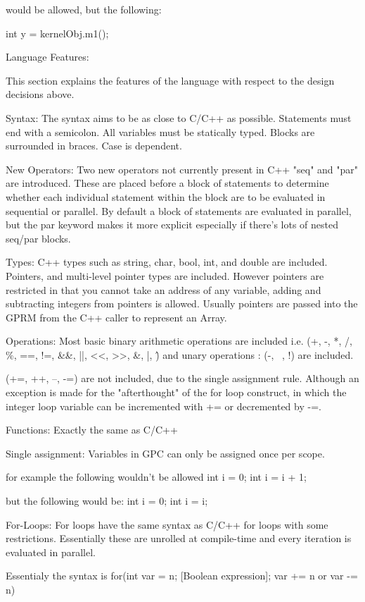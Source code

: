         would be allowed, but the following:

        int y = kernelObj.m1();



Language Features:

    This section explains the features of the language with respect to the design decisions above.

    Syntax:
        The syntax aims to be as close to C/C++ as possible. Statements must end with a semicolon. 
        All variables must be statically typed. Blocks are surrounded in braces. Case is dependent.

    New Operators:
        Two new operators not currently present in C++ "seq" and "par" are introduced. 
        These are placed before a block
        of statements to determine whether each individual statement within the block are
        to be evaluated in sequential or parallel. By default a block of statements are evaluated
        in parallel, but the par keyword makes it more explicit especially if there's lots of nested
        seq/par blocks.

    Types:
        C++ types such as string, char, bool, int, and double are included.
        Pointers, and multi-level pointer types are included.
        However pointers are restricted in that you cannot take
        an address of any variable, adding and subtracting integers
        from pointers is allowed. Usually pointers are passed into
        the GPRM from the C++ caller to represent an Array.
        
    Operations:
        Most basic binary arithmetic operations are included i.e. 
        (+, -, *, /, \%, ==, !=, \&\&, ||, <<, >>, \&, |, \^) and
        unary operations :
        (-, ~, !) 
        are included. 

        (+=, ++, --, -=) are not included, due to the single assignment rule.
        Although an exception is made for the "afterthought" of the for loop construct, in which
        the integer loop variable can be incremented with += or decremented by -=.

    Functions:
        Exactly the same as C/C++ 


    Single assignment:
       Variables in GPC can only be assigned once per scope.

       for example the following wouldn't be allowed
           int i = 0;
           int i = i + 1;

       but the following would be:
           int i = 0;
           {
               int i = i;
           }

    For-Loops:
       For loops have the same syntax as C/C++ for loops with some restrictions.
       Essentially these are unrolled at compile-time and every iteration is evaluated in parallel.
       
       Essentialy the syntax is for(int var = n; [Boolean expression]; var += n or var -= n) 
